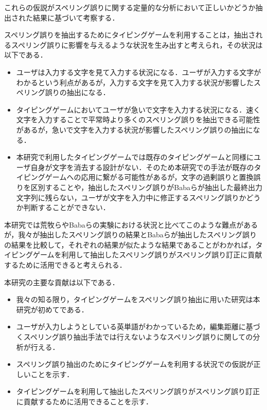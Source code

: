 これらの仮説がスペリング誤りに関する定量的な分析において正しいかどうか抽出された結果に基づいて考察する．

スペリング誤りを抽出するためにタイピングゲームを利用することは，抽出されるスペリング誤りに影響を与えるような状況を生み出すと考えられ，その状況は以下である．

\begin{itemize}
 \item ユーザは入力する文字を見て入力する状況になる．ユーザが入力する文字がわかるという利点があるが，入力する文字を見て入力する状況が影響したスペリング誤りの抽出になる．
 \item タイピングゲームにおいてユーザが急いで文字を入力する状況になる．速く文字を入力することで平常時より多くのスペリング誤りを抽出できる可能性があるが，急いで文字を入力する状況が影響したスペリング誤りの抽出になる．
 \item 本研究で利用したタイピングゲームでは既存のタイピングゲーム\cite{game}と同様にユーザ自身が文字を消去する設計がない．そのため本研究での手法が既存のタイピングゲームへの応用に繋がる可能性があるが，文字の過剰誤りと置換誤りを区別することや，抽出したスペリング誤りがBabaらが抽出した最終出力文字列に残らない，ユーザが文字を入力中に修正するスペリング誤り\cite{babaACL2012}かどうか判断することができない．
\end{itemize}

本研究では荒牧ら\cite{aramakiNLP2010}やBabaら\cite{babaACL2012}の実験における状況と比べてこのような難点があるが，我々が抽出したスペリング誤りの結果とBabaらが抽出したスペリング誤りの結果を比較して，それぞれの結果が似たような結果であることがわかれば，タイピングゲームを利用して抽出したスペリング誤りがスペリング誤り訂正に貢献するために活用できると考えられる．

本研究の主要な貢献は以下である．

\begin{itemize}
 \item 我々の知る限り，タイピングゲームをスペリング誤り抽出に用いた研究は本研究が初めてである．
 \item ユーザが入力しようとしている英単語がわかっているため，編集距離に基づくスペリング誤り抽出手法\cite{aramakiNLP2010}では行えないようなスペリング誤りに関しての分析が行える．
 \item スペリング誤り抽出のためにタイピングゲームを利用する状況での仮説が正しいことを示す．
 \item タイピングゲームを利用して抽出したスペリング誤りがスペリング誤り訂正に貢献するために活用できることを示す．
\end{itemize}

